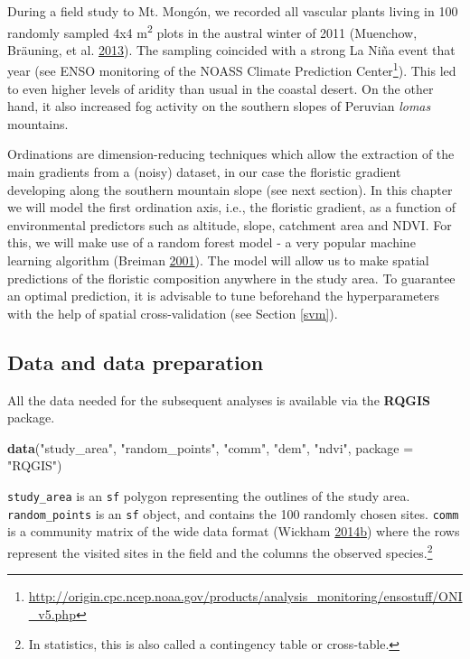 \documentclass[]{krantz}
\newenvironment{Shaded}{\begin{snugshade}}{\end{snugshade}}
\newcommand{\DataTypeTok}[1]{\textcolor[rgb]{0.27,0.27,0.27}{#1}}
\newcommand{\KeywordTok}[1]{\textcolor[rgb]{0.27,0.27,0.27}{\textbf{#1}}}
\newcommand{\NormalTok}[1]{#1}
\newcommand{\StringTok}[1]{\textcolor[rgb]{0.5,0.5,0.5}{#1}}
\let\rmarkdownfootnote\footnote%
\def\footnote{\protect\rmarkdownfootnote}
\renewcommand{\href}[2]{#2\footnote{\url{#1}}}
\begin{document}
During a field study to Mt. Mongón, we recorded all vascular plants living in 100 randomly sampled 4x4 m\textsuperscript{2} plots in the austral winter of 2011 (Muenchow, Bräuning, et al. \protect\hyperlink{ref-muenchow_predictive_2013}{2013}).
The sampling coincided with a strong La Niña event that year (see ENSO monitoring of the \href{http://origin.cpc.ncep.noaa.gov/products/analysis_monitoring/ensostuff/ONI_v5.php}{NOASS Climate Prediction Center}).
This led to even higher levels of aridity than usual in the coastal desert.
On the other hand, it also increased fog activity on the southern slopes of Peruvian \emph{lomas} mountains.

Ordinations are dimension-reducing techniques which allow the extraction of the main gradients from a (noisy) dataset, in our case the floristic gradient developing along the southern mountain slope (see next section).
In this chapter we will model the first ordination axis, i.e., the floristic gradient, as a function of environmental predictors such as altitude, slope, catchment area and NDVI.
For this, we will make use of a random forest model - a very popular machine learning algorithm (Breiman \protect\hyperlink{ref-breiman_random_2001}{2001}).
The model will allow us to make spatial predictions of the floristic composition anywhere in the study area.
To guarantee an optimal prediction, it is advisable to tune beforehand the hyperparameters with the help of spatial cross-validation (see Section \ref{svm}).

\hypertarget{data-and-data-preparation}{%
\subsection{Data and data preparation}\label{data-and-data-preparation}}

All the data needed for the subsequent analyses is available via the \textbf{RQGIS} package.

\begin{Shaded}
\begin{Highlighting}[]
\KeywordTok{data}\NormalTok{(}\StringTok{"study_area"}\NormalTok{, }\StringTok{"random_points"}\NormalTok{, }\StringTok{"comm"}\NormalTok{, }\StringTok{"dem"}\NormalTok{, }\StringTok{"ndvi"}\NormalTok{, }\DataTypeTok{package =} \StringTok{"RQGIS"}\NormalTok{)}
\end{Highlighting}
\end{Shaded}

\texttt{study\_area} is an \texttt{sf} polygon representing the outlines of the study area.
\texttt{random\_points} is an \texttt{sf} object, and contains the 100 randomly chosen sites.
\texttt{comm} is a community matrix of the wide data format (Wickham \protect\hyperlink{ref-wickham_tidy_2014}{2014}\protect\hyperlink{ref-wickham_tidy_2014}{b}) where the rows represent the visited sites in the field and the columns the observed species.\footnote{In statistics, this is also called a contingency table or cross-table.}
\end{document}
